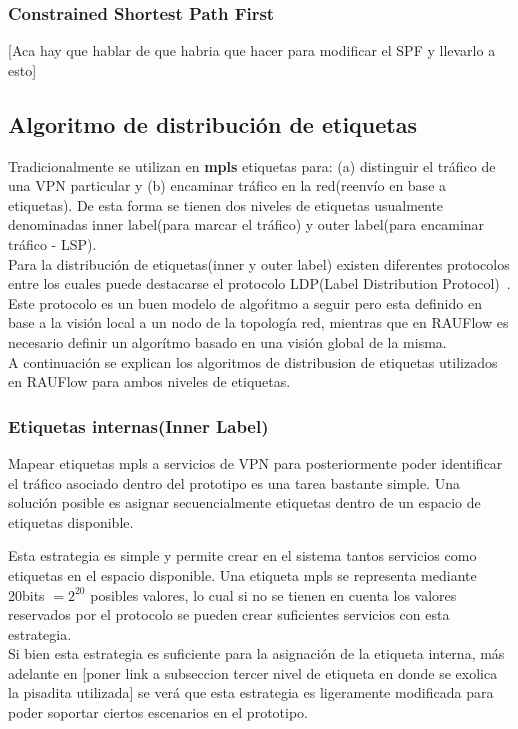 \subsubsection{Constrained Shortest Path First}
 
[Aca hay que hablar de que habria que hacer para modificar el SPF y llevarlo a esto]

\subsection{Algoritmo de distribución de etiquetas}
Tradicionalmente se utilizan en \textbf{mpls} etiquetas para: (a) distinguir el tr\'afico de una VPN particular y (b) encaminar tr\'afico en la red(reenvío en base a etiquetas). De esta forma se tienen dos niveles de etiquetas usualmente denominadas inner label(para marcar el tr\'afico) y outer label(para encaminar tr\'afico - LSP).\\

Para la distribución de etiquetas(inner y outer label) existen diferentes protocolos entre los cuales puede destacarse el protocolo LDP(Label Distribution Protocol)~\citep{LDPRFC}. Este protocolo es un buen modelo de algo\'ritmo a seguir pero esta definido en base a la visión local a un nodo de la topolog\'ia red, mientras que en RAUFlow es necesario definir un algor\'itmo basado en una visi\'on global de la misma.\\

A continuaci\'on se explican los algoritmos de distribusion de etiquetas utilizados en RAUFlow para ambos niveles de etiquetas.

\subsubsection{Etiquetas internas(Inner Label)}
Mapear etiquetas mpls a servicios de VPN para posteriormente poder identificar el tr\'afico asociado dentro del prototipo es una tarea bastante simple. Una soluci\'on posible es asignar secuencialmente etiquetas dentro de un espacio de etiquetas disponible.

Esta estrategia es simple y permite crear en el sistema tantos servicios como etiquetas en el espacio disponible. Una etiqueta mpls se representa mediante 20bits $= 2^{20}$ posibles valores, lo cual si no se tienen en cuenta los valores reservados por el protocolo se pueden crear suficientes servicios con esta estrategia.\\

Si bien esta estrategia es suficiente para la asignación de la etiqueta interna, m\'as adelante en [poner link a subseccion tercer nivel de etiqueta en donde se exolica la pisadita utilizada] se ver\'a que esta estrategia es ligeramente modificada para poder soportar ciertos escenarios en el prototipo.

